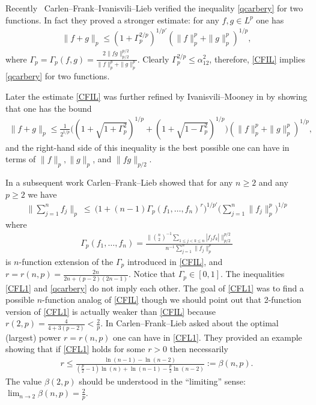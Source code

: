 \documentclass[11pt]{article}
\theoremstyle{definition}
\newcommand{\1}{\mathbf{1}}
\begin{document}
Recently~\cite{CFIL2021} Carlen--Frank--Ivanisvili--Lieb verified the inequality \eqref{qcarbery} for two functions. In fact they proved a stronger estimate: for any $f,g \in L^{p}$ one has 
\begin{align}\label{CFIL}
    \|f+g\|_{p} \leq \left(1+\Gamma_{p}^{2/p}\right)^{1/p'}\left(\|f\|_{p}^{p}+\|g\|_{p}^{p}\right)^{1/p}, 
\end{align}
where $\Gamma_{p}=\Gamma_{p}(f,g) = \frac{2\|fg\|_{p/2}^{p/2}}{\|f\|_{p}^{p}+\|g\|_{p}^{p}}.$
Clearly $\Gamma^{2/p}_{p} \leq \alpha_{12}^{2}$, therefore, \eqref{CFIL} implies \eqref{qcarbery} for two functions. 

Later the estimate \eqref{CFIL} was further refined by Ivanisvili--Mooney in \cite{IvanisviliMooney2020} by showing that one has the bound 
\begin{align*}
   \|f+g\|_{p} \leq \frac{1}{2^{1/p}}\Big((1+\sqrt{1+\Gamma_{p}^{2}})^{1/p}+(1+\sqrt{1-\Gamma_{p}^{2}})^{1/p}\Big)(\|f\|_{p}^{p}+\|g\|_{p}^{p})^{1/p},   
\end{align*}
and the right-hand side of this inequality is the best possible one can have in terms of $\|f\|_{p}, \|g\|_{p}$, and $\|fg\|_{p/2}$. 


In a subsequent work \cite{CFL2020} Carlen--Frank--Lieb showed that for any $n\geq 2$ and any $p\geq 2$ we have 
\begin{align}\label{CFL1}
\Big\|\sum_{j=1}^{n} f_j\Big\|_p \ \le\  \Big(1+(n-1)\Gamma_{p}(f_{1}, \ldots, f_{n})^{r}\Big)^{1/p'} \Big(\sum_{j=1}^{n} \|f_j\|_p^p\Big)^{1/p}
\end{align}
where 
\begin{align*}
    \Gamma_{p}(f_{1}, \ldots, f_{n}) = \frac{\Big \| \binom{n}{2}^{-1} \sum_{1\leq j<k\leq n} |f_{j}f_{k}|\Big \|_{p/2}^{p/2}}{n^{-1}\sum_{j=1}^{n}\|f_{j}\|_{p}^{p}}
\end{align*}
is $n$-function extension of the $\Gamma_{p}$ introduced in \eqref{CFIL}, and $r=r(n,p)=\frac{2n}{2n+(p-2)(2n-1)}$. Notice that $\Gamma_{p} \in [0,1]$. The inequalities \eqref{CFL1} and \eqref{qcarbery} do not imply each other. The goal of \eqref{CFL1} was to find a possible $n$-function analog of \eqref{CFIL} though we should point out that 2-function version of \eqref{CFL1} is actually weaker than \eqref{CFIL} because $r(2,p)=\frac{4}{4+3(p-2)}<\frac{2}{p}$. In \cite{CFL2020} Carlen--Frank--Lieb asked about the optimal (largest) power $r=r(n,p)$ one can have in \eqref{CFL1}. They provided an example showing that if \eqref{CFL1} holds for some $r>0$ then necessarily
\begin{align*}
    r \leq \frac{\ln(n-1) - \ln(n-2)}{(\frac{p}{2}-1) \ln(n) + \ln(n-1) - \frac{p}{2}\ln(n-2)} := \beta(n,p).
\end{align*}
The value $\beta(2,p)$ should be understood in the ``limiting'' sense:  $\lim_{n \to 2}\beta(n,p) = \frac{2}{p}$. 
\end{document}
